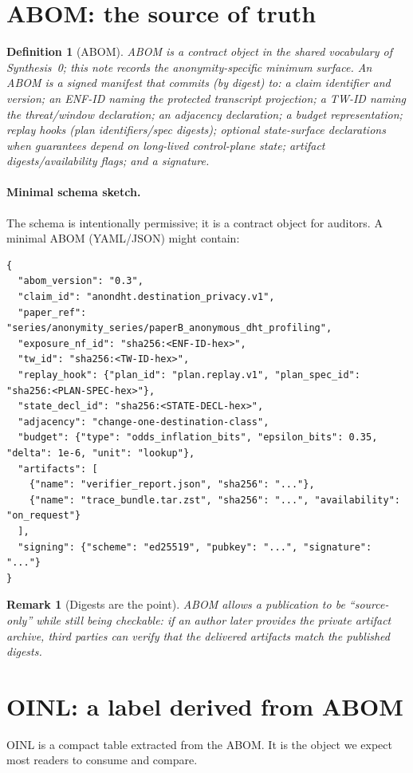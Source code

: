 \documentclass[11pt]{article}
\newtheorem{definition}{Definition}
\newtheorem{remark}{Remark}
\begin{document}
\section{ABOM: the source of truth}
\begin{definition}[ABOM]\label{def:abom}
ABOM is a contract object in the shared vocabulary of Synthesis~0; this note records the anonymity-specific minimum surface.\cite{series:contractobjects}
An ABOM is a signed manifest that commits (by digest) to: a claim identifier and version; an ENF-ID naming the protected transcript projection; a TW-ID naming the threat/window declaration; an adjacency declaration; a budget representation; replay hooks (plan identifiers/spec digests); optional state-surface declarations when guarantees depend on long-lived control-plane state; artifact digests/availability flags; and a signature.
\end{definition}

\paragraph{Minimal schema sketch.}
The schema is intentionally permissive; it is a contract object for auditors.
A minimal ABOM (YAML/JSON) might contain:
\begin{lstlisting}
{
  "abom_version": "0.3",
  "claim_id": "anondht.destination_privacy.v1",
  "paper_ref": "series/anonymity_series/paperB_anonymous_dht_profiling",
  "exposure_nf_id": "sha256:<ENF-ID-hex>",
  "tw_id": "sha256:<TW-ID-hex>",
  "replay_hook": {"plan_id": "plan.replay.v1", "plan_spec_id": "sha256:<PLAN-SPEC-hex>"},
  "state_decl_id": "sha256:<STATE-DECL-hex>",
  "adjacency": "change-one-destination-class",
  "budget": {"type": "odds_inflation_bits", "epsilon_bits": 0.35, "delta": 1e-6, "unit": "lookup"},
  "artifacts": [
    {"name": "verifier_report.json", "sha256": "..."},
    {"name": "trace_bundle.tar.zst", "sha256": "...", "availability": "on_request"}
  ],
  "signing": {"scheme": "ed25519", "pubkey": "...", "signature": "..."}
}
\end{lstlisting}

\begin{remark}[Digests are the point]
ABOM allows a publication to be ``source-only'' while still being checkable: if an author later provides the private artifact archive, third parties can verify that the delivered artifacts match the published digests.
\end{remark}

\section{OINL: a label derived from ABOM}
OINL is a compact table extracted from the ABOM.
It is the object we expect most readers to consume and compare.
\end{document}
